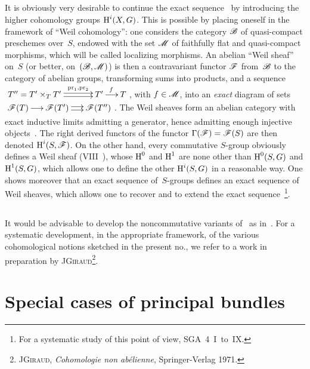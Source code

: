 \subsection{}
\label{XI.4.8}
It is obviously very desirable to continue the exact
sequence~ by introducing the higher cohomology groups
$\operatorname{H}^i(X,G)$. This is possible by placing oneself in
the framework of ``Weil cohomology'': one considers the
category $\cal{B}$ of quasi-compact preschemes over~$S$,
endowed with the set $\cal{M}$ of faithfully flat and
quasi-compact morphisms, which will be called localizing morphisms. An abelian ``Weil
sheaf'' on~$S$ (or better, on~$(\cal{B},\cal{M})$) is
then a contravariant functor $\cal{F}$ from~$\cal{B}$ to the
category of abelian groups, transforming sums into
products, and a sequence
${\def\labelstyle{\scriptstyle}\xymatrix@C=.5cm{T''=T'\times_TT'\ar@<+2pt>[rr]^-{\pr_1,\pr_2}\ar@<-2pt>[rr] &&T'\ar[r]^f & T}}$, with $f\in\cal{M}$, into an \emph{exact} diagram
of sets $\xymatrix@C=.5cm{\cal{F}(T)\ar[r] & \cal{F}(T')
\ar@<2pt>[r]\ar@<-2pt>[r] & \cal{F}(T'')}$. The Weil sheaves
form an abelian category with exact inductive limits
admitting a generator, hence admitting enough
injective objects~\cite{XI.1}. The right derived functors of the
functor $\Gamma(\cal{F})=\cal{F}(S)$ are then denoted
$\H^i(S,\cal{F})$. On the other hand, every commutative $S$-group
obviously defines a Weil sheaf (VIII~),
whose $\operatorname{H}^0$ and $\operatorname{H}^1$ are none other than $\operatorname{H}^0(S,G)$ and
$\operatorname{H}^1(S,G)$, which allows one to define the other $\operatorname{H}^i(S,G)$ in a
reasonable way. One
shows moreover that an exact sequence of~$S$-groups defines an
exact sequence of Weil sheaves, which allows one to recover and to
extend the exact sequence~\footnote{For a
systematic study of this point of view, \cf SGA~4~I~to~IX.}.

\subsection{}
\label{XI.4.9}
It would be advisable to develop the noncommutative variants
of~ as in~\cite{XI.2}. For a systematic
development, in the appropriate framework, of the various
cohomological notions sketched in the present no., we
refer to a work in preparation by
J\ptbl \textsc{Giraud}\footnote{\Cf J\ptbl \textsc{Giraud},
\emph{Cohomologie non ab\'elienne},
Springer-Verlag 1971.}.

\section{Special cases of principal bundles}
\label{XI.5}

